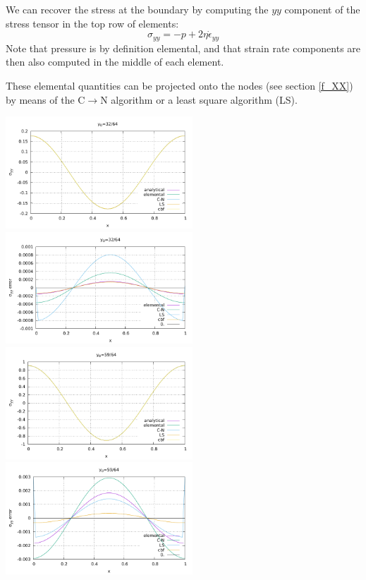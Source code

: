 We can recover the stress at the boundary by computing 
the $yy$ component of the stress tensor in the top row of elements: 
\[
\sigma_{yy} = -p + 2 \eta \dot{\epsilon}_{yy}
\]
Note that pressure is by definition elemental, and that strain rate
components are then also computed in the middle of each element.

These elemental quantities can be projected onto the nodes (see section \ref{f_XX})
by means of the C$\rightarrow$N algorithm or a least square algorithm (LS). 

\begin{center}
\includegraphics[width=7cm]{python_codes/fieldstone_27/results/32_64/sigmazz.pdf}
\includegraphics[width=7cm]{python_codes/fieldstone_27/results/32_64/sigmazz_error.pdf}\\
\includegraphics[width=7cm]{python_codes/fieldstone_27/results/59_64/sigmazz.pdf}
\includegraphics[width=7cm]{python_codes/fieldstone_27/results/59_64/sigmazz_error.pdf}\\

\end{center}
